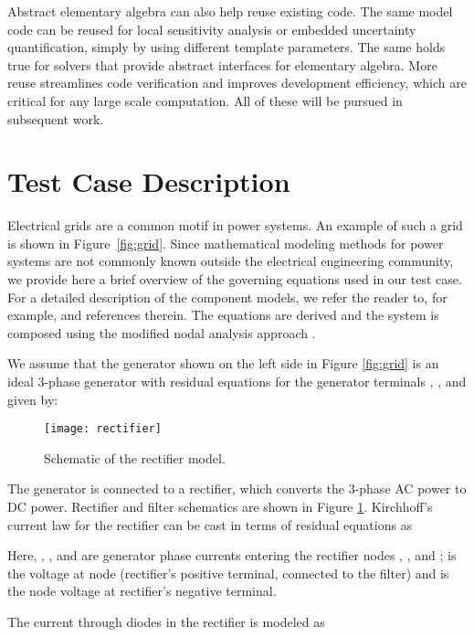 \documentclass[10pt]{ijnam}
\theoremstyle{definition}
\begin{document}
Abstract elementary algebra can also help reuse existing code. The same model code
can be reused for local sensitivity analysis or embedded uncertainty 
quantification, simply by using different template parameters. The same 
holds true for solvers that provide abstract interfaces for elementary 
algebra. More reuse streamlines code verification and improves 
development efficiency, which are critical for any large scale 
computation. All of these will be pursued in subsequent work.

\appendix

\section{Test Case Description} \label{sec:RectifierInverter}

Electrical grids  are a common motif in power systems. An example of such a grid is shown in Figure~\ref{fig:grid}.
Since mathematical modeling methods for power 
systems are not commonly known outside the electrical engineering 
community, we provide here a brief overview of the governing 
equations used in our test case. For a detailed description of 
the component models, we refer the reader to, for example, \cite{erickson2001}
and references therein. The equations are derived and the system 
is composed using the modified nodal analysis approach \cite{riaza2008}.

We assume that the generator shown on the left side in Figure \ref{fig:grid} 
is an ideal 3-phase generator with residual equations for the generator terminals , , and  given by:


\begin{figure}[htb]
    \centering
    \texttt{[image: rectifier]}
    \caption{Schematic of the rectifier model.}
    \label{fig:rectifier}
\end{figure}

The generator is connected to a rectifier, which converts the 3-phase 
AC power to DC power. Rectifier and filter schematics are shown in
Figure \ref{fig:rectifier}. 
Kirchhoff's current law for the rectifier can be cast in terms of 
residual equations as

Here, , , and  are generator phase currents 
entering the rectifier nodes , , and ;
 is the voltage at node  (rectifier's positive terminal,
connected to the filter) and  is the node voltage at 
rectifier's negative terminal. 

The current through diodes  in the rectifier is modeled as
 
\end{document}
